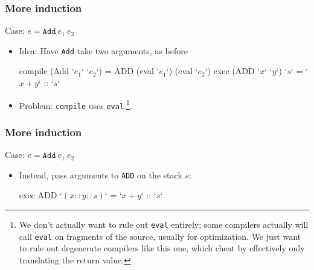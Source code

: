 \documentclass[usenames,dvipsnames]{beamer}
\begin{document}

\begin{frame}[fragile]
  \frametitle{More induction}
  \begin{totop}
    Case: $e = \texttt{Add}\ e_1\ e_2$
  \end{totop}

  \begin{itemize}
    \item Idea: Have \texttt{Add} take two arguments, as before

      \begin{code}
        compile (Add `$e_1$` `$e_2$`) = ADD (eval `$e_1$`) (eval `$e_2$`)
        exec (ADD `$x$` `$y$`) `$s$` = `$x+y$` :: `$s$`
      \end{code}

    \item Problem: \texttt{compile} uses \texttt{eval}.\footnote{
        We don't actually want to rule out \texttt{eval} entirely; some
        compilers actually will call \texttt{eval} on fragments of the source,
        usually for optimization. We just want to rule out degenerate compilers
        like this one, which cheat by effectively only translating the return
        value.
      }.
  \end{itemize}
\end{frame}


\begin{frame}[fragile]
  \frametitle{More induction}
  \begin{totop}
    Case: $e = \texttt{Add}\ e_1\ e_2$
  \end{totop}

  \begin{itemize}
    \item Instead, pass arguments to \texttt{ADD} on the stack $s$:

      \begin{code}
        exec ADD `$(x::y::s)$` = `$x+y$` :: `$s$`
      \end{code}
  \end{itemize}
\end{frame}

\end{document}
